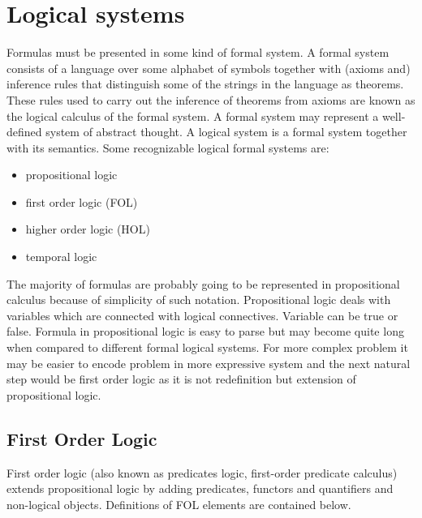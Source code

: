 \chapter{Logical systems}

Formulas must be presented in some kind of formal system. A formal system consists of a language over some alphabet of symbols together with (axioms and) inference rules that distinguish some of the strings in the language as theorems. These rules used to carry out the inference of theorems from axioms are known as the logical calculus of the formal system. A formal system may represent a well-defined system of abstract thought. A logical system is a formal system together with its semantics. Some recognizable logical formal systems are:

\begin{itemize}
  \item propositional logic 
  \item first order logic (FOL)
  \item higher order logic (HOL)
  \item temporal logic 
\end{itemize}

The majority of formulas are probably going to be represented in propositional calculus because of simplicity of such notation. Propositional logic deals with variables which are connected with logical connectives. Variable can be true or false. Formula in propositional logic is easy to parse but may become quite long when compared to different formal logical systems. For more complex problem it may be easier to encode problem in more expressive system and the next natural step would be first order logic as it is not redefinition but extension of propositional logic.

\section{First Order Logic}

First order logic (also known as predicates logic, first-order predicate calculus) extends propositional logic by adding predicates, functors and quantifiers and non-logical objects. Definitions of FOL elements are contained below.

